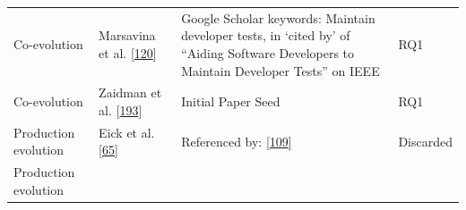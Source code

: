 \documentclass[]{book}
\begin{document}
\begin{longtable}[]{@{}llll@{}}
\begin{minipage}[t]{0.18\columnwidth}
Co-evolution\strut
\end{minipage} & \begin{minipage}[t]{0.16\columnwidth}\raggedright\strut
Marsavina et al. {[}\protect\hyperlink{ref-marsavina2014}{120}{]}\strut
\end{minipage} & \begin{minipage}[t]{0.50\columnwidth}\raggedright\strut
Google Scholar keywords: Maintain developer tests, in `cited by' of
``Aiding Software Developers to Maintain Developer Tests'' on IEEE\strut
\end{minipage} & \begin{minipage}[t]{0.04\columnwidth}\raggedright\strut
RQ1\strut
\end{minipage}\tabularnewline
\begin{minipage}[t]{0.18\columnwidth}\raggedright\strut
Co-evolution\strut
\end{minipage} & \begin{minipage}[t]{0.16\columnwidth}\raggedright\strut
Zaidman et al.
{[}\protect\hyperlink{ref-zaidman2011studying}{193}{]}\strut
\end{minipage} & \begin{minipage}[t]{0.50\columnwidth}\raggedright\strut
Initial Paper Seed\strut
\end{minipage} & \begin{minipage}[t]{0.04\columnwidth}\raggedright\strut
RQ1\strut
\end{minipage}\tabularnewline
\begin{minipage}[t]{0.18\columnwidth}\raggedright\strut
Production evolution\strut
\end{minipage} & \begin{minipage}[t]{0.16\columnwidth}\raggedright\strut
Eick et al. {[}\protect\hyperlink{ref-eick2001}{65}{]}\strut
\end{minipage} & \begin{minipage}[t]{0.50\columnwidth}\raggedright\strut
Referenced by: {[}\protect\hyperlink{ref-leung2015testing}{109}{]}\strut
\end{minipage} & \begin{minipage}[t]{0.04\columnwidth}\raggedright\strut
Discarded\strut
\end{minipage}\tabularnewline
\begin{minipage}[t]{0.18\columnwidth}\raggedright\strut
Production evolution\strut
\end{minipage} & \begin{minipage}[t]{0.16\columnwidth}\raggedright\strut

\end{minipage}
\end{longtable}
\end{document}
